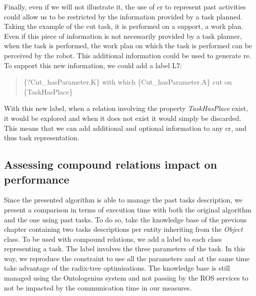 Finally, even if we will not illustrate it, the use of \acrshort{cr} to represent past activities could allow us to be restricted by the information provided by a task planned. Taking the example of the cut task, it is performed on a support, a work plan. Even if this piece of information is not necessarily provided by a task planner, when the task is performed, the work plan on which the task is performed can be perceived by the robot. This additional information could be used to generate \acrshort{re}. To support this new information, we could add a label L7:

\begin{quote} 
\centering 
\{?Cut\_hasParameter.K\} with which \{Cut\_hasParameter.A\} cut on \{TaskHasPlace\}
\end{quote}

With this new label, when a relation involving the property \textit{TaskHasPlace} exist, it would be explored and when it does not exist it would simply be discarded. This means that we can add additional and optional information to any \acrshort{cr}, and thus task representation.

\subsection{Assessing compound relations impact on performance}

Since the presented algorithm is able to manage the past tasks description, we present a comparison in terms of execution time with both the original algorithm and the one using past tasks. To do so, take the knowledge base of the previous chapter containing two tasks descriptions per entity inheriting from the \textit{Object} class. To be used with compound relations, we add a label to each class representing a task. The label involves the three parameters of the task. In this way, we reproduce the constraint to use all the parameters and at the same time take advantage of the radix-tree optimisations. The knowledge base is still managed using the Ontologenius system and not passing by the ROS services to not be impacted by the communication time in our measures.

